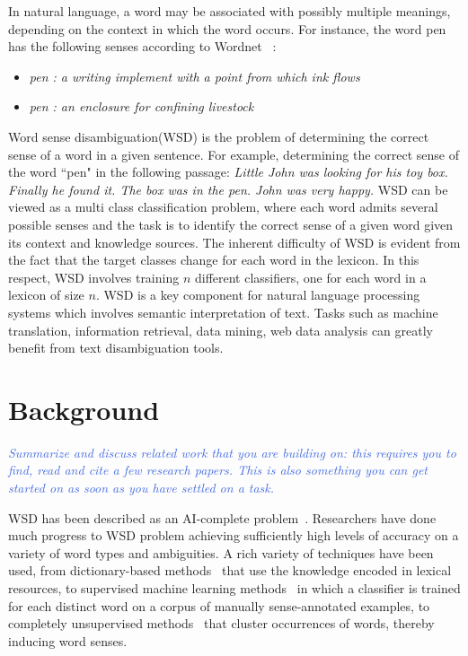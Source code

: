 \documentclass[11pt,letterpaper]{article}
\newcommand{\blue}[1]{\textcolor{RoyalBlue}{#1}}
\newcommand{\instructions}[1]{\blue{\textit{#1}}}
\begin{document}
In natural language, a word may be associated with possibly multiple meanings, depending on the context in which the word occurs. For instance, the word pen has the following senses according to Wordnet ~\cite{wordnet}:
\begin{itemize}
\item \emph{pen : a writing implement with a point from which ink flows}
\item \emph{pen : an enclosure for confining livestock}
\end{itemize}
Word sense disambiguation(WSD) is the problem of determining the correct sense of a word in a given sentence. For example, determining the correct sense of the word ``pen" in the following passage:
\emph{Little John was looking for his toy box. Finally he found it. The box was in the pen. John was very happy.}
WSD can be viewed as a multi class classification problem, where each word admits several possible senses and the task is to identify the correct sense of a given word given its context and knowledge sources. The inherent difficulty of WSD is evident from the fact that the target classes change for each word in the lexicon. In this respect, WSD involves training $n$ different classifiers, one for each word in a lexicon of size $n$. 
WSD is a key component for natural language processing systems which involves semantic interpretation of text. Tasks such as machine translation, information retrieval, data mining, web data analysis can greatly benefit from text disambiguation tools. 


\section{Background}
\label{sec:background}
\instructions{Summarize and discuss related work that you are building on: this requires you to find, read and cite a few research papers. This is also something you can get started on as soon as you have settled on a task.} 

WSD has been described as an AI-complete problem~\cite{mallery1988thinking}. Researchers have done much progress to WSD problem achieving sufficiently high levels of accuracy on a variety of word types and ambiguities. A rich variety of techniques have been used, from dictionary-based methods~\cite{mihalcea2007using} that use the knowledge encoded in lexical resources, to supervised machine learning methods~\cite{manning1999foundations} in which a classifier is trained for each distinct word on a corpus of manually sense-annotated examples, to completely unsupervised methods~\cite{yarowsky1995unsupervised} that cluster occurrences of words, thereby inducing word senses.
\end{document}
